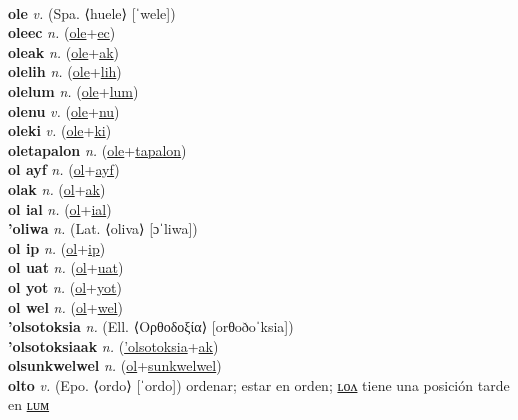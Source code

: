  \label{ol} \\
\textbf{ole} \textit{v.} (Spa. ⟨huele⟩ [ˈwele])
 \label{ole} \\
\textbf{oleec} \textit{n.} (\hyperref[ole]{ole}+\hyperref[ec]{ec})
 \label{oleec} \\
\textbf{oleak} \textit{n.} (\hyperref[ole]{ole}+\hyperref[ak]{ak})
 \label{oleak} \\
\textbf{olelih} \textit{n.} (\hyperref[ole]{ole}+\hyperref[lih]{lih})
 \label{olelih} \\
\textbf{olelum} \textit{n.} (\hyperref[ole]{ole}+\hyperref[lum]{lum})
 \label{olelum} \\
\textbf{olenu} \textit{v.} (\hyperref[ole]{ole}+\hyperref[nu]{nu})
 \label{olenu} \\
\textbf{oleki} \textit{v.} (\hyperref[ole]{ole}+\hyperref[ki]{ki})
 \label{oleki} \\
\textbf{oletapalon} \textit{n.} (\hyperref[ole]{ole}+\hyperref[tapalon]{tapalon})
 \label{oletapalon} \\
\textbf{ol ayf} \textit{n.} (\hyperref[ol]{ol}+\hyperref[ayf]{ayf})
 \label{ol ayf} \\
\textbf{olak} \textit{n.} (\hyperref[ol]{ol}+\hyperref[ak]{ak})
 \label{olak} \\
\textbf{ol ial} \textit{n.} (\hyperref[ol]{ol}+\hyperref[ial]{ial})
 \label{ol ial} \\
\textbf{'oliwa} \textit{n.} (Lat. ⟨oliva⟩ [ɔˈliwa])
 \label{'oliwa} \\
\textbf{ol ip} \textit{n.} (\hyperref[ol]{ol}+\hyperref[ip]{ip})
 \label{ol ip} \\
\textbf{ol uat} \textit{n.} (\hyperref[ol]{ol}+\hyperref[uat]{uat})
 \label{ol uat} \\
\textbf{ol yot} \textit{n.} (\hyperref[ol]{ol}+\hyperref[yot]{yot})
 \label{ol yot} \\
\textbf{ol wel} \textit{n.} (\hyperref[ol]{ol}+\hyperref[wel]{wel})
 \label{ol wel} \\
\textbf{'olsotoksia} \textit{n.} (Ell. ⟨Ορθοδοξία⟩ [orθoðoˈksia])
 \label{'olsotoksia} \\
\textbf{'olsotoksiaak} \textit{n.} (\hyperref['olsotoksia]{'olsotoksia}+\hyperref[ak]{ak})
 \label{'olsotoksiaak} \\
\textbf{olsunkwelwel} \textit{n.} (\hyperref[ol]{ol}+\hyperref[sunkwelwel]{sunkwelwel})
 \label{olsunkwelwel} \\
\textbf{olto} \textit{v.} (Epo. ⟨ordo⟩ [ˈordo])
ordenar; estar en orden; \hyperref[oltolon]{ʟᴏᴧ} tiene una posición tarde en \hyperref[oltolum]{ʟᴜᴍ} \label{olto} \\
